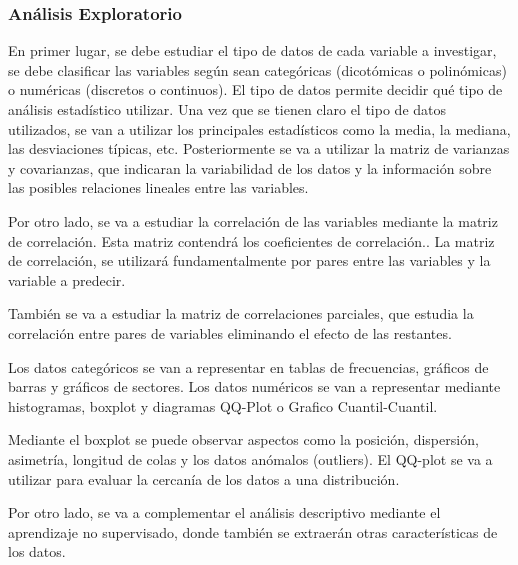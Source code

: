 \subsubsection{Análisis Exploratorio}


En primer lugar, se debe estudiar el tipo de datos de cada variable a investigar, se debe clasificar las variables según sean categóricas (dicotómicas o polinómicas) o numéricas (discretos o continuos). El tipo de datos permite decidir qué tipo de análisis estadístico utilizar.
Una vez que se tienen claro el tipo de datos utilizados, se van a utilizar los principales estadísticos como la media, la mediana, las desviaciones típicas, etc.
Posteriormente se va a utilizar la matriz de varianzas y covarianzas, que indicaran la variabilidad de los datos y la información sobre las posibles relaciones lineales entre las variables. 

Por otro lado, se va a estudiar la correlación de las variables mediante la matriz de correlación. Esta matriz contendrá los coeficientes de correlación.\cite{JMMarin}. La matriz de correlación, se utilizará fundamentalmente por pares entre las variables y la variable a predecir.

También se va a estudiar la matriz de correlaciones parciales, que estudia la correlación entre pares de variables eliminando el efecto de las restantes.\cite{JMMarin}

Los datos categóricos se van a representar en tablas de frecuencias, gráficos de barras y gráficos de sectores. Los datos numéricos se van a representar mediante histogramas, boxplot y diagramas QQ-Plot o Grafico Cuantil-Cuantil. \cite{Orellana2001}

Mediante el boxplot se puede observar aspectos como la posición, dispersión, asimetría, longitud de colas y los datos anómalos (outliers). 
El QQ-plot se va a utilizar para evaluar la cercanía de los datos a una distribución. \cite{Orellana2001}

Por otro lado, se va a complementar el análisis descriptivo mediante el aprendizaje no supervisado, donde también se extraerán otras características de los datos.

